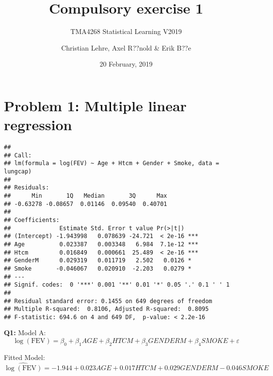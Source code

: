 \documentclass[]{article}
\title{Compulsory exercise 1}
\subtitle{TMA4268 Statistical Learning V2019}
\author{Christian Lehre, Axel R??nold \& Erik B??e}
\date{20 February, 2019}
\newenvironment{Shaded}{\begin{snugshade}}{\end{snugshade}}
\newcommand{\KeywordTok}[1]{\textcolor[rgb]{0.13,0.29,0.53}{\textbf{#1}}}
\newcommand{\DataTypeTok}[1]{\textcolor[rgb]{0.13,0.29,0.53}{#1}}
\newcommand{\FloatTok}[1]{\textcolor[rgb]{0.00,0.00,0.81}{#1}}
\newcommand{\StringTok}[1]{\textcolor[rgb]{0.31,0.60,0.02}{#1}}
\newcommand{\OperatorTok}[1]{\textcolor[rgb]{0.81,0.36,0.00}{\textbf{#1}}}
\newcommand{\NormalTok}[1]{#1}
\begin{document}
\maketitle

\section{Problem 1: Multiple linear
regression}\label{problem-1-multiple-linear-regression}

\begin{Shaded}
\end{Shaded}

\begin{verbatim}
## 
## Call:
## lm(formula = log(FEV) ~ Age + Htcm + Gender + Smoke, data = lungcap)
## 
## Residuals:
##      Min       1Q   Median       3Q      Max 
## -0.63278 -0.08657  0.01146  0.09540  0.40701 
## 
## Coefficients:
##              Estimate Std. Error t value Pr(>|t|)    
## (Intercept) -1.943998   0.078639 -24.721  < 2e-16 ***
## Age          0.023387   0.003348   6.984  7.1e-12 ***
## Htcm         0.016849   0.000661  25.489  < 2e-16 ***
## GenderM      0.029319   0.011719   2.502   0.0126 *  
## Smoke       -0.046067   0.020910  -2.203   0.0279 *  
## ---
## Signif. codes:  0 '***' 0.001 '**' 0.01 '*' 0.05 '.' 0.1 ' ' 1
## 
## Residual standard error: 0.1455 on 649 degrees of freedom
## Multiple R-squared:  0.8106, Adjusted R-squared:  0.8095 
## F-statistic: 694.6 on 4 and 649 DF,  p-value: < 2.2e-16
\end{verbatim}

\textbf{Q1:} \newline
Model A:
\[ \log(\text{FEV}) = \beta_0 + \beta_1AGE + \beta_2HTCM +\beta_3GENDERM  +
\beta_4SMOKE + \varepsilon\]

Fitted Model:
\[ \hat{\log(\text{FEV})} = -1.944 + 0.023AGE + 0.017HTCM + 0.029GENDERM -0.046SMOKE\]
\end{document}
